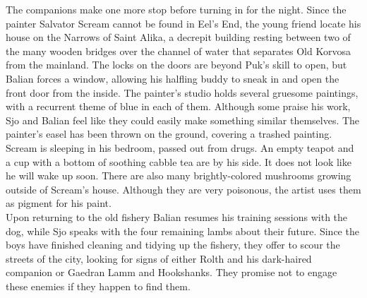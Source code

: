 The companions make one more stop before turning in for the night. Since the painter Salvator Scream cannot be found in Eel's End, the young friend locate his house on the Narrows of Saint Alika, a decrepit building resting between two of the many wooden bridges over the channel of water that separates Old Korvosa from the mainland. The locks on the doors are beyond Puk's skill to open, but Balian forces a window, allowing his halfling buddy to sneak in and open the front door from the inside. The painter's studio holds several gruesome paintings, with a recurrent theme of blue in each of them. Although some praise his work, Sjo and Balian feel like they could easily make something similar themselves. The painter's easel has been thrown on the ground, covering a trashed painting. Scream is sleeping in his bedroom, passed out from drugs. An empty teapot and a cup with a bottom of soothing cabble tea are by his side. It does not look like he will wake up soon. There are also many brightly-colored mushrooms growing outside of Scream's house. Although they are very poisonous, the artist uses them as pigment for his paint.\\

Upon returning to the old fishery Balian resumes his training sessions with the dog, while Sjo speaks with the four remaining lambs about their future. Since the boys have finished cleaning and tidying up the fishery, they offer to scour the streets of the city, looking for signs of either Rolth and his dark-haired companion or Gaedran Lamm and Hookshanks. They promise not to engage these enemies if they happen to find them.\\

